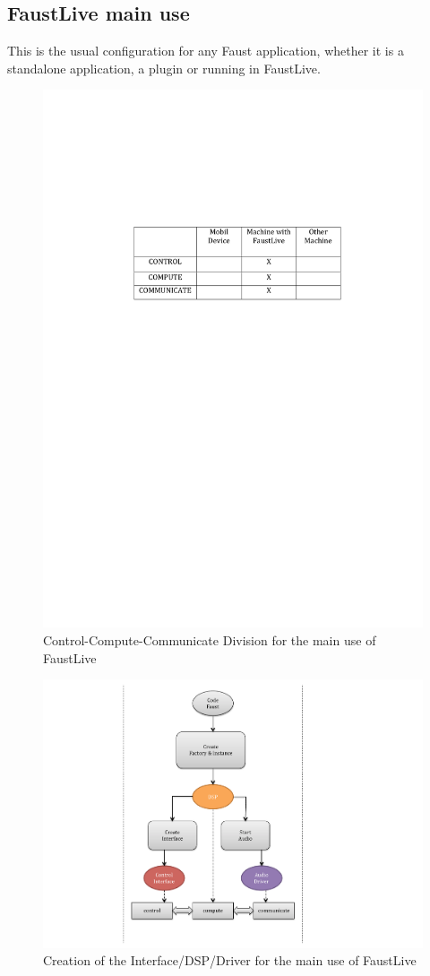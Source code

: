 \documentclass[a4paper]{article}
\begin{document}
\subsection{FaustLive main use}
This is the usual configuration for any Faust application, whether it is a standalone application, a plugin or running in FaustLive.
\begin{figure}[!h]
\begin{center}
\includegraphics[width=0.7\columnwidth]{images/1CCC}
\caption{Control-Compute-Communicate Division for the main use of FaustLive}
\label{fig:1CCC}
\end{center}
\end{figure}

\begin{figure}[!h]
\begin{center}
\includegraphics[width=\columnwidth]{images/CCC1}
\caption{Creation of the Interface/DSP/Driver for the main use of FaustLive}
\label{fig:CCC1}
\end{center}
\end{figure}
\end{document}
